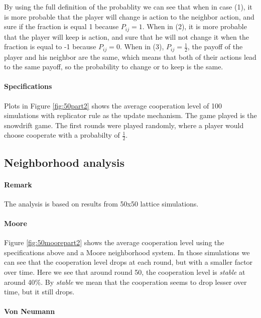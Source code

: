 \documentclass[letterpaper]{article}
\begin{document}
By using the full definition of the probablity we can see that when in
case (1), it is more probable that the player will change is action
to the neighbor action, and sure if the fraction is equal 1
because $P_{ij} = 1$. When in (2),
it is more probable that the player will keep is action, and sure that
he will not change it when the fraction is equal to -1
because $P_{ij} = 0$. When in (3),
$P_{ij} = \frac{1}{2}$,
the payoff of the player and his neighbor are the same, which means that
both of their actions lead to the same payoff, so the probability to change
or to keep is the same.

\paragraph{Specifications}
Plots in Figure \ref{fig:50part2} shows the average cooperation level of 100
simulations with replicator rule as the update mechanism. The game played
is the snowdrift game.
The first rounds were played randomly,
where a player would choose cooperate with a probabilty of $\frac{1}{2}$.

\subsection{Neighborhood analysis}

\paragraph{Remark} The analysis is based on results from 50x50 lattice
simulations.

\paragraph{Moore}

Figure \ref{fig:50moorepart2} shows the average cooperation level using
the specifications above and a Moore neighborhood system.
In those simulations we can see that the cooperation
level drops at each round, but with a smaller factor over time.
Here we see that around round 50, the cooperation level
is \textit{stable} at around 40\%. By \textit{stable} we mean that the
cooperation seems to drop lesser over time, but it still drops.

\paragraph{Von Neumann}
\end{document}
